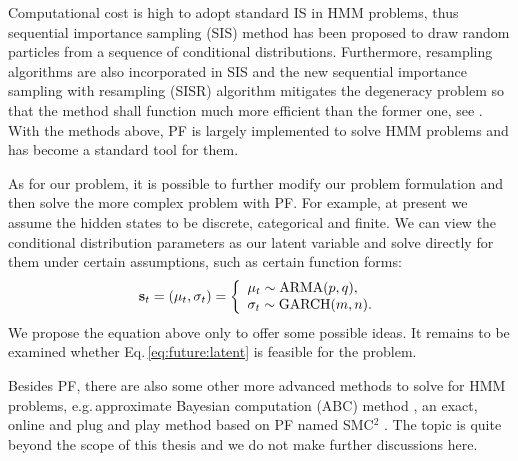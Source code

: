 Computational cost is high to adopt standard IS in HMM problems,
thus sequential importance sampling (SIS) method has been proposed to 
draw random particles from a sequence of conditional distributions.
Furthermore, resampling algorithms are also incorporated in SIS and the new
sequential importance sampling with resampling (SISR) algorithm
mitigates the degeneracy problem so that the method shall
function much more efficient than the former one, see \cite{Rubin:1987co,Gordon:1993up}.
With the methods above, 
PF is largely implemented to solve HMM problems and has become a standard tool for them.

As for our problem,
it is possible to further modify our problem formulation and then 
solve the more complex problem with PF.
For example,
at present we assume the hidden states to be discrete, categorical and finite.
We can view the conditional distribution parameters as our latent variable 
and solve directly for them under certain assumptions,
such as certain function forms:
		\begin{equation}
		\label{eq:future:latent}
		{\mathbf s}_t = (\mu_t,\sigma_t) = \left \{ 
		\begin{array}{l}
		\mu_t \sim \text{ARMA}(p,q), \\
		\sigma_t \sim \text{GARCH}(m,n). \\
		\end{array}
		\right.
		\end{equation}
We propose the equation above only to offer some possible ideas.
It remains to be examined whether Eq.\,\ref{eq:future:latent} is feasible for the problem.

Besides PF, there are also some other more advanced methods to solve for HMM problems,
e.g.\,approximate Bayesian computation (ABC) method \cite{Toni:2009abc,Dean:2014pe},
an exact, online and plug and play method based on PF named SMC$^2$ \cite{Jacob:2015um}.
The topic is quite beyond the scope of this thesis and we do not make further discussions here.







